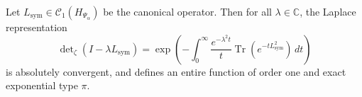 \begin{lemma}\label{lem:laplace-heat-trace-convergence}
Let \( L_{\mathrm{sym}} \in \mathcal{C}_1(H_{\Psi_\alpha}) \) be the canonical operator. Then for all \( \lambda \in \mathbb{C} \), the Laplace representation
\begin{equation}
\det\nolimits_\zeta(I - \lambda L_{\mathrm{sym}}) = \exp\left(- \int_0^\infty \frac{e^{-\lambda^2 t}}{t} \operatorname{Tr}(e^{-t L_{\mathrm{sym}}^2}) \, dt \right)
\end{equation}
is absolutely convergent, and defines an entire function of order one and exact exponential type \( \pi \).
\end{lemma}
%  